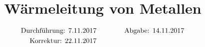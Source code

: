 

\subject{v204}
\title{Wärmeleitung von Metallen}
\date{%
\begin{align}
\text{Durchführung: 7.11.2017} & \hspace{3em} & \text{Abgabe: 14.11.2017} \notag \\
\text{Korrektur: 22.11.2017} & \hspace {3em} & \notag
\end{align}
}



\maketitle
\thispagestyle{empty}
\tableofcontents
\newpage






\nocite{*}
\printbibliography{}


